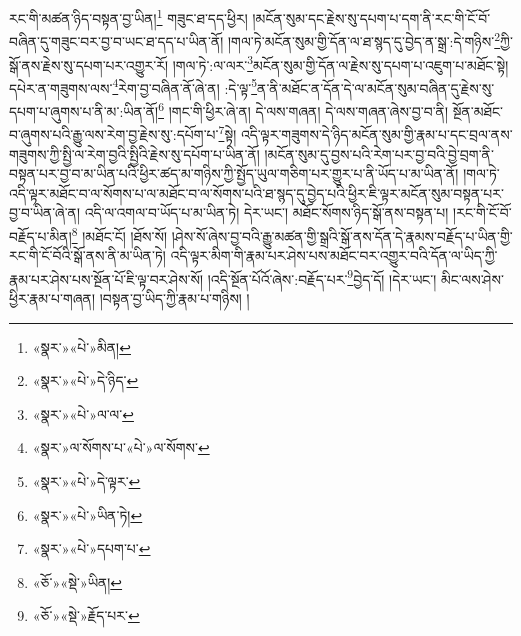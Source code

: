 རང་གི་མཚན་ཉིད་བསྟན་བྱ་ཡིན།\footnote{«སྣར་»«པེ་»མིན།} གཟུང་ཐ་དད་ཕྱིར། །མངོན་སུམ་དང་རྗེས་སུ་དཔག་པ་དག་ནི་རང་གི་ངོ་བོ་བཞིན་དུ་གཟུང་བར་བྱ་བ་ཡང་ཐ་དད་པ་ཡིན་ནོ། །གལ་ཏེ་མངོན་སུམ་གྱི་དོན་ལ་ཐ་སྙད་དུ་བྱེད་ན་སྒྲ་:དེ་གཉིས་\footnote{«སྣར་»«པེ་»དེ་ཉིད་}ཀྱི་སྒོ་ནས་རྗེས་སུ་དཔག་པར་འགྱུར་རོ། །གལ་ཏེ་:ལ་ལར་\footnote{«སྣར་»«པེ་»ལ་ལ་}མངོན་སུམ་གྱི་དོན་ལ་རྗེས་སུ་དཔག་པ་འཇུག་པ་མཐོང་སྟེ། དཔེར་ན་གཟུགས་ལས་\footnote{«སྣར་»ལ་སོགས་པ་«པེ་»ལ་སོགས་}རེག་བྱ་བཞིན་ནོ་ཞེ་ན། :དེ་ལྟ་\footnote{«སྣར་»«པེ་»དེ་ལྟར་}ན་ནི་མཐོང་ན་དོན་དེ་ལ་མངོན་སུམ་བཞིན་དུ་རྗེས་སུ་དཔག་པ་ཞུགས་པ་ནི་མ་:ཡིན་ནོ།\footnote{«སྣར་»«པེ་»ཡིན་ཏེ།} །གང་གི་ཕྱིར་ཞེ་ན། དེ་ལས་གཞན། དེ་ལས་གཞན་ཞེས་བྱ་བ་ནི། སྔོན་མཐོང་བ་ཞུགས་པའི་རྒྱུ་ལས་རེག་བྱ་རྗེས་སུ་:དཔོག་པ་\footnote{«སྣར་»«པེ་»དཔག་པ་}སྟེ། འདི་ལྟར་གཟུགས་དེ་ཉིད་མངོན་སུམ་གྱི་རྣམ་པ་དང་བྲལ་ནས་གཟུགས་ཀྱི་སྤྱི་ལ་རེག་བྱའི་སྤྱིའི་རྗེས་སུ་དཔོག་པ་ཡིན་ནོ། །མངོན་སུམ་དུ་བྱས་པའི་རེག་པར་བྱ་བའི་བྱེ་བྲག་ནི་བསྟན་པར་བྱ་བ་མ་ཡིན་པའི་ཕྱིར་ཚད་མ་གཉིས་ཀྱི་སྤྱོད་ཡུལ་གཅིག་པར་གྱུར་པ་ནི་ཡོད་པ་མ་ཡིན་ནོ། །གལ་ཏེ་འདི་ལྟར་མཐོང་བ་ལ་སོགས་པ་ལ་མཐོང་བ་ལ་སོགས་པའི་ཐ་སྙད་དུ་བྱེད་པའི་ཕྱིར་ཇི་ལྟར་མངོན་སུམ་བསྟན་པར་བྱ་བ་ཡིན་ཞེ་ན། འདི་ལ་འགལ་བ་ཡོད་པ་མ་ཡིན་ཏེ། དེར་ཡང་། མཐོང་སོགས་ཉིད་སྒོ་ནས་བསྟན་པ། །རང་གི་ངོ་བོ་བརྗོད་པ་མིན།\footnote{«ཅོ་»«སྡེ་»ཡིན།} །མཐོང་ངོ། །ཐོས་སོ། །ཤེས་སོ་ཞེས་བྱ་བའི་རྒྱུ་མཚན་གྱི་སྒྲའི་སྒོ་ནས་དོན་དེ་རྣམས་བརྗོད་པ་ཡིན་གྱི་རང་གི་ངོ་བོའི་སྒོ་ནས་ནི་མ་ཡིན་ཏེ། འདི་ལྟར་མིག་གི་རྣམ་པར་ཤེས་པས་མཐོང་བར་འགྱུར་བའི་དོན་ལ་ཡིད་ཀྱི་རྣམ་པར་ཤེས་པས་སྔོན་པོ་ཇི་ལྟ་བར་ཤེས་སོ། །འདི་སྔོན་པོའོ་ཞེས་:བརྗོད་པར་\footnote{«ཅོ་»«སྡེ་»རྗོད་པར་}བྱེད་དོ། །དེར་ཡང་། མིང་ལས་ཤེས་ཕྱིར་རྣམ་པ་གཞན། །བསྟན་བྱ་ཡིད་ཀྱི་རྣམ་པ་གཉིས། །
